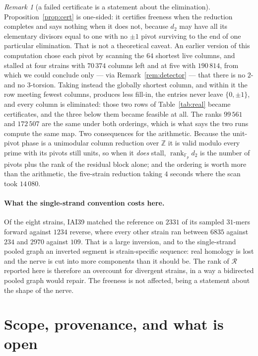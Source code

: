 \documentclass[11pt]{article}
\theoremstyle{plain}
\theoremstyle{definition}
\theoremstyle{remark}
\newtheorem{remark}[theorem]{Remark}
\newcommand{\Z}{\mathbb{Z}}
\newcommand{\rank}{\operatorname{rank}}
\newcommand{\Rec}{\mathcal{R}}
\begin{document}
\begin{remark}[a failed certificate is a statement about the elimination]\label{rem:order}
Proposition~\ref{prop:cert} is one-sided: it certifies freeness when the reduction completes
and says nothing when it does not, because $d_2$ may have all its elementary divisors equal
to one with no $\pm1$ pivot surviving to the end of one particular elimination. That is not a
theoretical caveat. An earlier version of this computation chose each pivot by scanning the
$64$ shortest live columns, and stalled at four strains with $70\,374$ columns left and at
five with $190\,814$, from which we could conclude only --- via
Remark~\ref{rem:detector} --- that there is no $2$- and no $3$-torsion. Taking instead the
globally shortest column, and within it the row meeting fewest columns, produces less fill-in,
the entries never leave $\{0,\pm1\}$, and every column is eliminated: those two rows of
Table~\ref{tab:real} became certificates, and the three below them became feasible at all.
The ranks $99\,561$ and $172\,507$ are the same
under both orderings, which is what says the two runs compute the same map. Two consequences
for the arithmetic. Because the unit-pivot phase is a unimodular column reduction over $\Z$ it
is valid modulo every prime with its pivots still units, so when it \emph{does} stall,
$\rank_{\mathbb F_p}d_2$ is the number of pivots plus the rank of the residual block alone;
and the ordering is worth more than the arithmetic, the five-strain reduction taking $4$
seconds where the scan took $14\,080$.
\end{remark}

\paragraph{What the single-strand convention costs here.} Of the eight strains, IAI39
matched the reference on $2331$ of its sampled $31$-mers forward against $1234$ reverse,
where every other strain ran between $6835$ against $234$ and $2970$ against $109$. That is a
large inversion, and to the
single-strand pooled graph an inverted segment is strain-specific sequence: real homology is
lost and the nerve is cut into more components than it should be. The rank of $\Rec$ reported
here is therefore an overcount for divergent strains, in a way a bidirected pooled graph
would repair. The freeness is not affected, being a statement about the shape of the nerve.

\section{Scope, provenance, and what is open}
\end{document}
